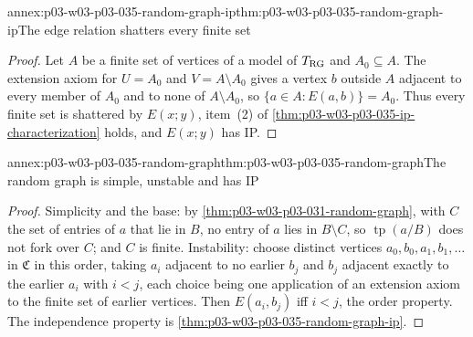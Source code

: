 \begin{annexitem}{annex:p03-w03-p03-035-random-graph-ip}{thm:p03-w03-p03-035-random-graph-ip}{The edge relation shatters every finite set}
\begin{proof}
Let \(A\) be a finite set of vertices of a model of \(T_{\rm RG}\) and
\(A_0\subseteq A\).  The extension axiom for \(U=A_0\) and
\(V=A\setminus A_0\) gives a vertex \(b\) outside \(A\) adjacent to every
member of \(A_0\) and to none of \(A\setminus A_0\), so
\(\{a\in A:E(a,b)\}=A_0\).  Thus every finite set is shattered by \(E(x;y)\),
item~(2) of \cref{thm:p03-w03-p03-035-ip-characterization} holds, and
\(E(x;y)\) has IP.
\end{proof}
\end{annexitem}

\begin{annexitem}{annex:p03-w03-p03-035-random-graph}{thm:p03-w03-p03-035-random-graph}{The random graph is simple, unstable and has IP}
\begin{proof}
Simplicity and the base: by \cref{thm:p03-w03-p03-031-random-graph}, with
\(C\) the set of entries of \(a\) that lie in \(B\), no entry of \(a\) lies in
\(B\setminus C\), so \(\operatorname{tp}(a/B)\) does not fork over \(C\); and
\(C\) is finite.  Instability: choose distinct vertices
\(a_0,b_0,a_1,b_1,\ldots\) in \(\mathfrak C\) in this order, taking \(a_i\)
adjacent to no earlier \(b_j\) and \(b_j\) adjacent exactly to the earlier
\(a_i\) with \(i<j\), each choice being one application of an extension axiom
to the finite set of earlier vertices.  Then \(E(a_i,b_j)\) iff \(i<j\), the
order property.  The independence property is
\cref{thm:p03-w03-p03-035-random-graph-ip}.
\end{proof}
\end{annexitem}
